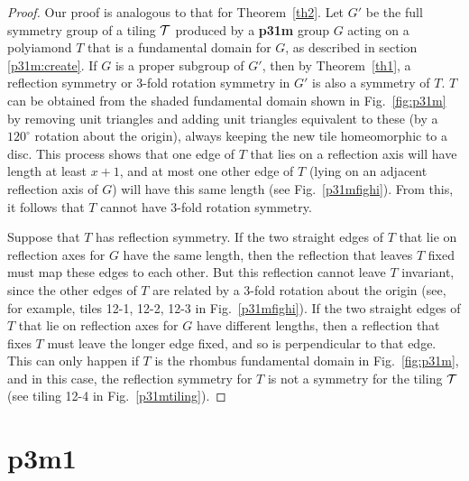 \documentclass{ws-ijcga}
\begin{document}
\begin{proof}
Our proof is analogous to that for Theorem~\ref{th2}. 
Let $G'$ be the full symmetry group of a
tiling $\cal T$ produced by a {\bf p31m} group $G$ acting on a polyiamond $T$ that is a fundamental domain for $G$, 
as described in section \ref{p31m:create}. 
If $G$ is a proper subgroup of $G'$, then by Theorem~\ref{th1}, 
a reflection symmetry or 3-fold rotation symmetry in $G'$ is also a symmetry of $T$. 
$T$ can be obtained from the shaded fundamental domain shown in Fig.~\ref{fig:p31m} 
by removing unit triangles and adding unit triangles equivalent to these 
(by a $120^\circ$ rotation about the origin), 
always keeping the new tile homeomorphic to a disc. 
This process shows that one edge of $T$ that lies on a reflection axis will
have length at least $x+1$, and at most one other edge of $T$ (lying on an adjacent reflection axis of $G$) 
will have this same length (see Fig.~\ref{p31mfighi}). 
From this, it follows that $T$ cannot have 3-fold rotation symmetry.

Suppose that $T$ has reflection symmetry. 
If the two straight edges of $T$ that lie on reflection
axes for $G$ have the same length, then the reflection that leaves $T$ fixed must map these edges to each other. 
But this reflection cannot leave $T$ invariant, since the other edges of $T$ are related by
a 3-fold rotation about the origin (see, for example, tiles 12-1, 12-2, 12-3 in Fig.~\ref{p31mfighi}). 
If the two straight edges of $T$ that lie on reflection axes for $G$ have different lengths, 
then a reflection that fixes $T$ must leave the longer edge fixed, 
and so is perpendicular to that edge. 
This can only happen if $T$ is the rhombus fundamental domain in Fig.~\ref{fig:p31m}, 
and in this case, the reflection symmetry for $T$ is not a symmetry for the tiling $\cal T$ 
(see tiling 12-4 in Fig.~\ref{p31mtiling}).
\end{proof}












\section{{\bf p3m1}}
\end{document}
